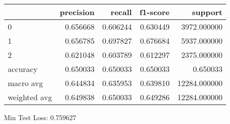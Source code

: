\begin{tabular}{lrrrr}
\toprule
{} &  precision &    recall &  f1-score &       support \\
\midrule
0            &   0.656668 &  0.606244 &  0.630449 &   3972.000000 \\
1            &   0.656785 &  0.697827 &  0.676684 &   5937.000000 \\
2            &   0.621048 &  0.603789 &  0.612297 &   2375.000000 \\
accuracy     &   0.650033 &  0.650033 &  0.650033 &      0.650033 \\
macro avg    &   0.644834 &  0.635953 &  0.639810 &  12284.000000 \\
weighted avg &   0.649838 &  0.650033 &  0.649286 &  12284.000000 \\
\bottomrule
\end{tabular}

Min Test Loss: 0.759627